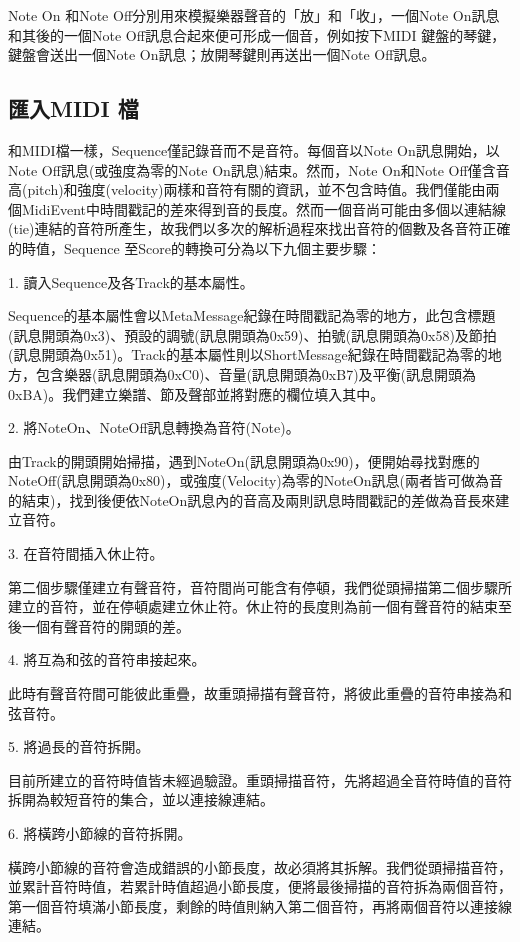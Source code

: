 \documentclass[12pt,a4paper,oneside]{report}
\begin{document}
Note On 和Note Off分別用來模擬樂器聲音的「放」和「收」，一個Note On訊息和其後的一個Note Off訊息合起來便可形成一個音，例如按下MIDI 鍵盤的琴鍵，鍵盤會送出一個Note On訊息；放開琴鍵則再送出一個Note Off訊息。


\subsection{匯入MIDI 檔} %

和MIDI檔一樣，Sequence僅記錄音而不是音符。每個音以Note On訊息開始，以Note Off訊息(或強度為零的Note On訊息)結束。然而，Note On和Note Off僅含音高(pitch)和強度(velocity)兩樣和音符有關的資訊，並不包含時值。我們僅能由兩個MidiEvent中時間戳記的差來得到音的長度。然而一個音尚可能由多個以連結線(tie)連結的音符所產生，故我們以多次的解析過程來找出音符的個數及各音符正確的時值，Sequence 至Score的轉換可分為以下九個主要步驟： 

1. 讀入Sequence及各Track的基本屬性。 

Sequence的基本屬性會以MetaMessage紀錄在時間戳記為零的地方，此包含標題(訊息開頭為0x3)、預設的調號(訊息開頭為0x59)、拍號(訊息開頭為0x58)及節拍(訊息開頭為0x51)。Track的基本屬性則以ShortMessage紀錄在時間戳記為零的地方，包含樂器(訊息開頭為0xC0)、音量(訊息開頭為0xB7)及平衡(訊息開頭為0xBA)。我們建立樂譜、節及聲部並將對應的欄位填入其中。

2. 將NoteOn、NoteOff訊息轉換為音符(Note)。 

由Track的開頭開始掃描，遇到NoteOn(訊息開頭為0x90)，便開始尋找對應的NoteOff(訊息開頭為0x80)，或強度(Velocity)為零的NoteOn訊息(兩者皆可做為音的結束)，找到後便依NoteOn訊息內的音高及兩則訊息時間戳記的差做為音長來建立音符。

3. 在音符間插入休止符。 

第二個步驟僅建立有聲音符，音符間尚可能含有停頓，我們從頭掃描第二個步驟所建立的音符，並在停頓處建立休止符。休止符的長度則為前一個有聲音符的結束至後一個有聲音符的開頭的差。

4. 將互為和弦的音符串接起來。 

此時有聲音符間可能彼此重疊，故重頭掃描有聲音符，將彼此重疊的音符串接為和弦音符。

5. 將過長的音符拆開。 

目前所建立的音符時值皆未經過驗證。重頭掃描音符，先將超過全音符時值的音符拆開為較短音符的集合，並以連接線連結。

6. 將橫跨小節線的音符拆開。

橫跨小節線的音符會造成錯誤的小節長度，故必須將其拆解。我們從頭掃描音符，並累計音符時值，若累計時值超過小節長度，便將最後掃描的音符拆為兩個音符，第一個音符填滿小節長度，剩餘的時值則納入第二個音符，再將兩個音符以連接線連結。
\end{document}
